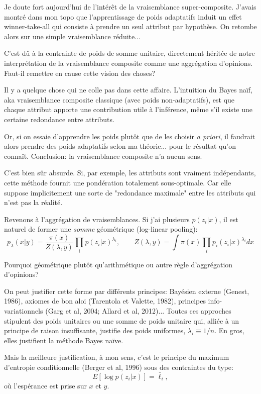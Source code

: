 \documentclass{article}
\begin{document}
Je doute fort aujourd'hui de l'int\'er\^et de la vraisemblance super-composite. J'avais montr\'e dans mon topo que l'apprentissage de poids adaptatifs induit un effet winner-take-all qui consiste \`a prendre un seul attribut par hypoth\`ese. On retombe alors sur une simple vraisemblance r\'eduite... 

C'est d\^u \`a la contrainte de poids de somme unitaire, directement h\'erit\'ee de notre interpr\'etation de la vraisemblance composite comme une aggr\'egation d'opinions. Faut-il remettre en cause cette vision des choses? 

Il y a quelque chose qui ne colle pas dans cette affaire. L'intuition du Bayes na\"if, aka vraisemblance composite classique (avec poids non-adaptatifs), est que chaque attribut apporte une contribution utile \`a l'inf\'erence, m\^eme s'il existe une certaine redondance entre attributs. 

Or, si on essaie d'apprendre les poids plut\^ot que de les choisir {\em a priori}, il faudrait alors prendre des poids adaptatifs selon ma th\'eorie... pour le r\'esultat qu'on conna\^it. Conclusion: la vraisemblance composite n'a aucun sens. 

C'est bien s\^ur absurde. Si, par exemple, les attributs sont vraiment ind\'ependants, cette m\'ethode fournit une pond\'eration totalement sous-optimale. Car elle suppose implicitement une sorte de "redondance maximale" entre les attributs qui n'est pas la r\'ealit\'e.

Revenons \`a l'aggr\'egation de vraisemblances. Si j'ai plusieurs $p(z_i|x)$, il est naturel de former une {\em somme} g\'eom\'etrique (log-linear pooling):
$$
p_\lambda(x|y) = \frac{\pi(x)}{Z(\lambda, y)}\prod_i p(z_i|x)^{\lambda_i},
\qquad 
Z(\lambda, y) = \int \pi(x) \prod_i p_i(z_i|x)^{\lambda_i} dx
$$

Pourquoi g\'eom\'etrique plut\^ot qu'arithm\'etique ou autre r\`egle d'aggr\'egation d'opinions?

On peut justifier cette forme par diff\'erents principes: Bay\'esien externe (Genest, 1986), axiomes de bon aloi (Tarentola et Valette, 1982), principes info-variationnels (Garg et al, 2004; Allard et al, 2012)... Toutes ces approches stipulent des poids unitaires ou une somme de poids unitaire qui, alli\'ee \`a un principe de raison insuffisante, justifie des poids uniformes, $\lambda_i\equiv 1/n$. En gros, elles justifient la m\'ethode Bayes na\"ive.

Mais la meilleure justification, \`a mon sens, c'est le principe du maximum d'entropie conditionnelle (Berger et al, 1996) sous des contraintes du type:
$$
E[\log p(z_i|x)] = \bar{\ell}_i,
$$
o\`u l'esp\'erance est prise sur $x$ et $y$. 
\end{document}
